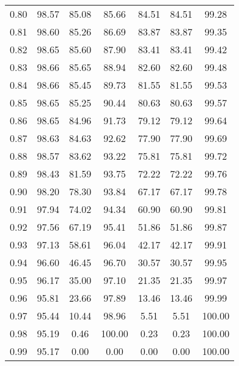 \begin{tabular}{|c|c|c|c|c|c|c|}
      0.80 &     98.57 &     85.08 &      85.66 &   84.51 &      84.51 &         99.28 \\
      0.81 &     98.60 &     85.26 &      86.69 &   83.87 &      83.87 &         99.35 \\
      0.82 &     98.65 &     85.60 &      87.90 &   83.41 &      83.41 &         99.42 \\
      0.83 &     98.66 &     85.65 &      88.94 &   82.60 &      82.60 &         99.48 \\
      0.84 &     98.66 &     85.45 &      89.73 &   81.55 &      81.55 &         99.53 \\
      0.85 &     98.65 &     85.25 &      90.44 &   80.63 &      80.63 &         99.57 \\
      0.86 &     98.65 &     84.96 &      91.73 &   79.12 &      79.12 &         99.64 \\
      0.87 &     98.63 &     84.63 &      92.62 &   77.90 &      77.90 &         99.69 \\
      0.88 &     98.57 &     83.62 &      93.22 &   75.81 &      75.81 &         99.72 \\
      0.89 &     98.43 &     81.59 &      93.75 &   72.22 &      72.22 &         99.76 \\
      0.90 &     98.20 &     78.30 &      93.84 &   67.17 &      67.17 &         99.78 \\
      0.91 &     97.94 &     74.02 &      94.34 &   60.90 &      60.90 &         99.81 \\
      0.92 &     97.56 &     67.19 &      95.41 &   51.86 &      51.86 &         99.87 \\
      0.93 &     97.13 &     58.61 &      96.04 &   42.17 &      42.17 &         99.91 \\
      0.94 &     96.60 &     46.45 &      96.70 &   30.57 &      30.57 &         99.95 \\
      0.95 &     96.17 &     35.00 &      97.10 &   21.35 &      21.35 &         99.97 \\
      0.96 &     95.81 &     23.66 &      97.89 &   13.46 &      13.46 &         99.99 \\
      0.97 &     95.44 &     10.44 &      98.96 &    5.51 &       5.51 &        100.00 \\
      0.98 &     95.19 &      0.46 &     100.00 &    0.23 &       0.23 &        100.00 \\
      0.99 &     95.17 &      0.00 &       0.00 &    0.00 &       0.00 &        100.00 \\
\bottomrule
\end{tabular}
